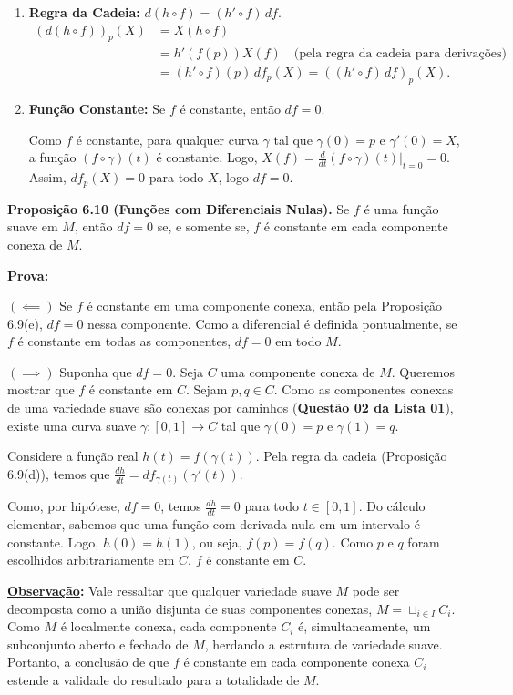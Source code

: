 {\begin{enumerate}[label=(\alph*)]
		\item \textbf{Regra da Cadeia:} $d(h \circ f) = (h' \circ f) \, df$.
		\begin{align*}
			(d(h \circ f))_p(X) &= X(h \circ f) \\
			&= h'(f(p)) X(f) \quad \text{(pela regra da cadeia para derivações)} \\
			&= (h' \circ f)(p) \, df_p(X) = ((h' \circ f) \, df)_p(X).
		\end{align*}
		
		\item \textbf{Função Constante:} Se $f$ é constante, então $df = 0$.
		
		Como $f$ é constante, para qualquer curva $\gamma$ tal que $\gamma(0)=p$ e $\gamma'(0)=X$, a função $(f \circ \gamma)(t)$ é constante. Logo, $X(f) = \tfrac{d}{dt}(f \circ \gamma)(t) \big|_{t=0} = 0$. Assim, $df_p(X) = 0$ para todo $X$, logo $df = 0$.
	\end{enumerate}
	\textbf{Proposição 6.10 (Funções com Diferenciais Nulas).} Se $f$ é uma função suave em $M$, então $df = 0$ se, e somente se, $f$ é constante em cada componente conexa de $M$.
	
	\textbf{Prova:}
	
	$(\impliedby)$ Se $f$ é constante em uma componente conexa, então pela Proposição 6.9(e), $df = 0$ nessa componente. Como a diferencial é definida pontualmente, se $f$ é constante em todas as componentes, $df = 0$ em todo $M$.
	
	$(\implies)$ Suponha que $df = 0$. Seja $C$ uma componente conexa de $M$. Queremos mostrar que $f$ é constante em $C$. 
	Sejam $p, q \in C$. Como as componentes conexas de uma variedade suave são conexas por caminhos (\textbf{Questão 02 da Lista 01}), existe uma curva suave $\gamma : [0,1] \to C$ tal que $\gamma(0)=p$ e $\gamma(1)=q$.
	
	Considere a função real $h(t) = f(\gamma(t))$. Pela regra da cadeia (Proposição 6.9(d)), temos que	$\tfrac{dh}{dt} = df_{\gamma(t)}(\gamma'(t))$.
	
	Como, por hipótese, $df = 0$, temos $\tfrac{dh}{dt} = 0$ para todo $t \in [0,1]$. Do cálculo elementar, sabemos que uma função com derivada nula em um intervalo é constante. Logo, $h(0) = h(1)$, ou seja, $f(p) = f(q)$. Como $p$ e $q$ foram escolhidos arbitrariamente em $C$, $f$ é constante em $C$.\hfill\cqd
	
	\vspace{0.3cm}
	\textbf{\underline{Observação}:} Vale ressaltar que qualquer variedade suave $M$ pode ser decomposta como a união disjunta de suas componentes conexas, $M = \sqcup_{i \in I} C_i$. Como $M$ é localmente conexa, cada componente $C_i$ é, simultaneamente, um subconjunto aberto e fechado de $M$, herdando a estrutura de variedade suave. Portanto, a conclusão de que $f$ é constante em cada componente conexa $C_i$ estende a validade do resultado para a totalidade de $M$.
}


